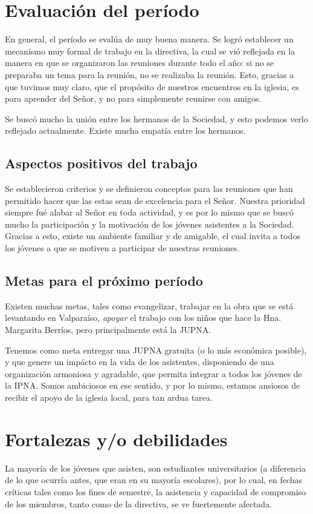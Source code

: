 \documentclass[12pt,letterpaper]{article}
\begin{document}
\section{Evaluación del período}
En general, el período se evalúa de muy buena manera. Se logró establecer un mecanismo muy formal de trabajo en la directiva, la cual se vió reflejada en la manera en que se organizaron las reuniones durante todo el año: si no se preparaba un tema para la reunión, no se realizaba la reunión. Esto, gracias a que tuvimos muy claro, que el propósito de nuestros encuentros en la iglesia, es para aprender del Señor, y no para simplemente reunirse con amigos.

Se buscó mucho la unión entre los hermanos de la Sociedad, y esto podemos verlo reflejado actualmente. Existe mucha empatía entre los hermanos.

\subsection{Aspectos positivos del trabajo}
Se establecieron criterios y se definieron conceptos para las reuniones que han permitido hacer que las estas sean de excelencia para el Señor. Nuestra prioridad siempre fué alabar al Señor en toda actividad, y es por lo mismo que se buscó mucho la participación y la motivación de los jóvenes asistentes a la Sociedad. Gracias a esto, existe un ambiente familiar y de amigable, el cual invita a todos los jóvenes a que se motiven a participar de nuestras reuniones.

\subsection{Metas para el próximo período}
Existen muchas metas, tales como evangelizar, trabajar en la obra que se está levantando en Valparaíso, \textit{apoyar} el trabajo con los niños que hace la Hna. Margarita Berríos, pero principalmente está la JUPNA.

Tenemos como meta entregar una JUPNA gratuita (o lo más económica posible), y que genere un impácto en la vida de los asistentes, disponiendo de una organización armoniosa y agradable, que permita integrar a todos los jóvenes de la IPNA. Somos ambiciosos en ese sentido, y por lo mismo, estamos ansiosos de recibir el apoyo de la iglesia local, para tan ardua tarea.

\section{Fortalezas y/o debilidades}
La mayoría de los jóvenes que asisten, son estudiantes universitarios (a diferencia de lo que ocurría antes, que eran en su mayoría escolares), por lo cual, en fechas críticas tales como los fines de semestre, la asistencia y capacidad de compromiso de los miembros, tanto como de la directiva, se ve fuertemente afectada.
\end{document}
